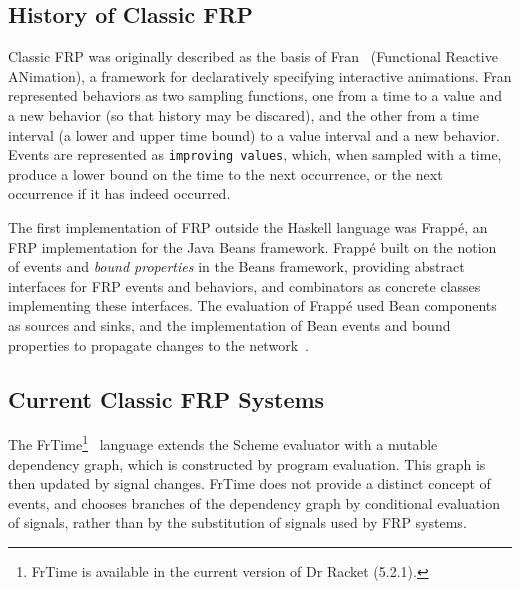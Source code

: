 \subsection{History of Classic FRP}
\label{subsection:Background-Classic_FRP-History_of_Classic_FRP}
Classic FRP was originally described as the basis of Fran~\cite{Elliott1997}
(Functional Reactive ANimation), a framework for declaratively specifying
interactive animations. Fran represented behaviors as two sampling functions,
one from a time to a value and a new behavior (so that history may be discared),
and the other from a time interval (a lower and upper time bound) to a value
interval and a new behavior. Events are represented as {\tt improving values},
which, when sampled with a time, produce a lower bound on the time to the next
occurrence, or the next occurrence if it has indeed occurred.

The first implementation of FRP outside the Haskell language was Frapp\'{e}, an
FRP implementation for the Java Beans framework. Frapp\'{e} built on the notion
of events and {\em bound properties} in the Beans framework, providing abstract
interfaces for FRP events and behaviors, and combinators as concrete classes
implementing these interfaces. The evaluation of Frapp\'{e} used Bean components
as sources and sinks, and the implementation of Bean events and bound properties
to propagate changes to the network~\cite{Courtney2001-2}. 

\subsection{Current Classic FRP Systems}
\label{subsection:Background-Classic_FRP-Current_Classic_FRP_Systems}

The FrTime\footnote{FrTime is available in the current version of Dr Racket (5.2.1).}~\cite{Cooper2006}
language extends the Scheme evaluator with a mutable dependency graph, which is
constructed by program evaluation. This graph is then updated by signal changes.
FrTime does not provide a distinct concept of events, and chooses branches of
the dependency graph by conditional evaluation of signals, rather than by the
substitution of signals used by FRP systems.

